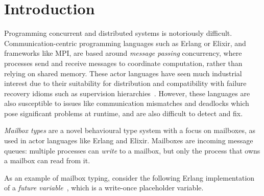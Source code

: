 \section{Introduction}

Programming concurrent and distributed systems is notoriously difficult.\\
Communication-centric programming languages such as Erlang or Elixir, and
frameworks like MPI, are based around \emph{message passing} concurrency, where
processes send and receive messages to coordinate computation, rather than
relying on shared memory.
These actor languages have seen much industrial
interest due to their suitability for distribution and compatibility with
failure recovery idioms such as supervision hierarchies~\cite{Armstrong03}.
However, these languages are also
susceptible to issues like communication mismatches and deadlocks which pose
significant problems at runtime, and are also difficult to detect and fix.

%
%
\emph{Mailbox types}
\cite{deliguoroMailboxTypesUnordered2018,fowlerSpecialDeliveryProgramming2023}
are a novel behavioural type system with a focus on mailboxes, as used in actor
languages like Erlang and Elixir.
Mailboxes are incoming message queues: multiple processes can \emph{write} to
a mailbox, but only the process that owns a mailbox can read from it.


As an example of mailbox typing, consider the following Erlang implementation of
a \emph{future variable}~\cite{fowlerSpecialDeliveryProgramming2023}, which is a
write-once placeholder variable.


